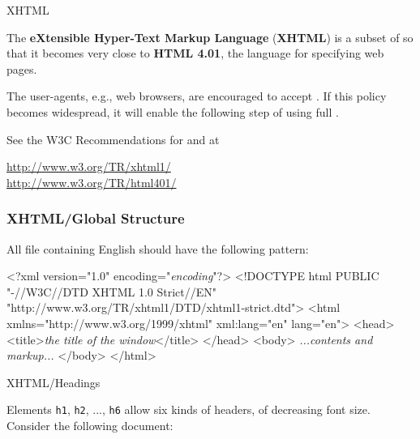 
%
\begin{frame}{XHTML}

The \textbf{eXtensible Hyper-Text Markup Language}
(\textbf{\textsf{XHTML}}) is a subset of \XML so that it becomes very
close to \textbf{\textsf{HTML 4.01}}, the language for specifying web
pages.

\bigskip

The user-agents, e.g., web browsers, are encouraged to accept
\XHTML. If this policy becomes widespread, it will enable the
following step of using full \XML.

\bigskip

See the W3C Recommendations for \XHTML and \HTML at
\begin{center}
\url{http://www.w3.org/TR/xhtml1/}\\
\url{http://www.w3.org/TR/html401/}
\end{center}

\end{frame}

%
\begin{frame}[containsverbatim]
\frametitle{XHTML/Global Structure}

All \XHTML file containing English should have the following pattern:
{\small
\begin{semiverbatim}
<?xml version="1.0" encoding="\emph{encoding}"?>
<!DOCTYPE html
    PUBLIC "-//W3C//DTD XHTML 1.0 Strict//EN"
    "http://www.w3.org/TR/xhtml1/DTD/xhtml1-strict.dtd">
<html xmlns="http://www.w3.org/1999/xhtml"
      xml:lang="en" lang="en">
  <head>
    <title>\textit{the title of the window}</title>
  </head>
  <body>
     \emph{...contents and markup...}
  </body>
</html>
\end{semiverbatim}
}

\end{frame}

%
\begin{frame}{XHTML/Headings}

Elements \texttt{h1}, \texttt{h2}, ..., \texttt{h6} allow six kinds of
headers, of decreasing font size. Consider the following document:

\end{frame}

